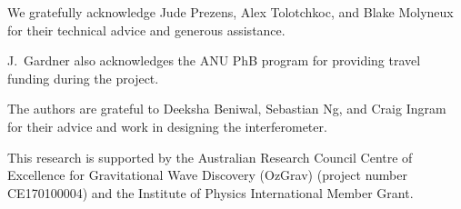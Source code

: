 \documentclass[prb,preprint]{revtex4-1}
\begin{document}
\begin{acknowledgments}
We gratefully acknowledge Jude Prezens, Alex Tolotchkoc, and Blake Molyneux for their technical advice and generous assistance.

J.~Gardner also acknowledges the ANU PhB program for providing travel funding during the project.

The authors are grateful to Deeksha Beniwal, Sebastian Ng, and Craig Ingram for their advice and work in designing the interferometer. 

This research is supported by the Australian Research Council Centre of Excellence for Gravitational Wave Discovery (OzGrav) (project number CE170100004) and the Institute of Physics International Member Grant.



\end{acknowledgments}




\end{document}
